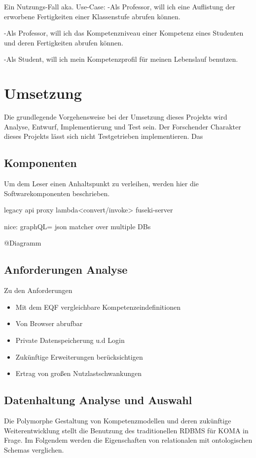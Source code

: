 \documentclass[
12pt,
english,
ngerman,
headsepline,
twoside,
openright,
numbers=noenddot,version=first
]{scrreprt}
\begin{document}
Ein Nutzungs-Fall aka. Use-Case:
-Als Professor, will ich eine Auflistung der erworbene Fertigkeiten einer Klassenstufe abrufen können.

-Als Professor, will ich das Kompetenzniveau einer Kompetenz eines Studenten und deren Fertigkeiten abrufen können.

-Als Student, will ich mein Kompetenzprofil für meinen Lebenslauf benutzen.

\chapter{Umsetzung}
Die grundlegende Vorgehensweise bei der Umsetzung dieses Projekts wird Analyse, Entwurf, Implementierung und Test sein. Der Forschender Charakter dieses Projekts lässt sich nicht Testgetrieben implementieren.
Das

\section{Komponenten}

Um dem Leser einen Anhaltspunkt zu verleihen, werden hier die Softwarekomponenten beschrieben.

legacy api proxy\cite{sbarski2017serverless}
lambda<convert/invoke> fuseki-server\label{komponenten:fuseki}

nice: graphQL= json matcher over multiple DBs

@Diagramm

\section{Anforderungen Analyse}

Zu den Anforderungen
\begin{itemize}
\item Mit dem EQF vergleichbare Kompetenzeindefinitionen
\item Von Browser abrufbar
\item Private Datenspeicherung u.d Login
\item Zukünftige Erweiterungen berücksichtigen
\item Ertrag von großen Nutzlastschwankungen
\end{itemize}


\section{Datenhaltung Analyse und Auswahl}

Die Polymorphe Gestaltung von Kompetenzmodellen und deren zukünftige Weiterentwicklung stellt die Benutzung des traditionellen RDBMS für KOMA in Frage. Im Folgendem werden die Eigenschaften von relationalen mit ontologischen Schemas verglichen.
\end{document}
